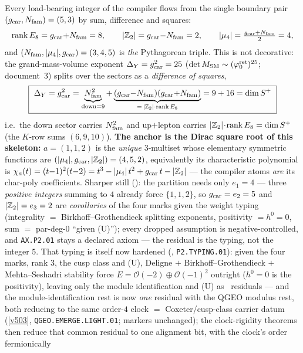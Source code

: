 \begin{keybox}[The whole integer skeleton from one pair $(\gcar,\Nfam)=(5,3)$ \mE\ (\veri{v53\_compiler\_core.py})]
Every load-bearing integer of the compiler flows from the single boundary pair
$(\gcar,\Nfam)=(5,3)$ by sum, difference and squares:
\[
  \operatorname{rank}E_8=g_{\mathrm{car}}{+}N_{\mathrm{fam}}=8,\qquad
  |\mathbb{Z}_2|=g_{\mathrm{car}}{-}N_{\mathrm{fam}}=2,\qquad
  |\mu_4|=\tfrac{g_{\mathrm{car}}+N_{\mathrm{fam}}}{2}=4,
\]
and $(N_{\mathrm{fam}},|\mu_4|,g_{\mathrm{car}})=(3,4,5)$ is \emph{the} Pythagorean triple. This is not decorative: the
grand-mass-volume exponent $\Delta_Y=g_{\mathrm{car}}^2=25$ ($\det M_{\mathrm{SM}}\sim(\varphi_0^{\mathrm{ret}})^{25}$; document~3)
splits over the sectors as a \emph{difference of squares},
\[
  \boxed{\ \Delta_Y=g_{\mathrm{car}}^2
  =\underbrace{N_{\mathrm{fam}}^2}_{\text{down}=9}
  +\underbrace{(g_{\mathrm{car}}{-}N_{\mathrm{fam}})(g_{\mathrm{car}}{+}N_{\mathrm{fam}})}_{=\,|\mathbb{Z}_2|\cdot\operatorname{rank}E_8}
  =9+16=\dim S^+\ }
\]
i.e.\ the down sector carries $N_{\mathrm{fam}}^2$ and up$+$lepton carries $|\mathbb{Z}_2|\!\cdot\!\operatorname{rank}E_8=\dim S^+$
(the $K$-row sums $(6,9,10)$). \textbf{The anchor is the Dirac square root of this skeleton:} $a=(1,1,2)$ is
the \emph{unique} $3$-multiset whose elementary symmetric functions are $(|\mu_4|,g_{\mathrm{car}},|\mathbb{Z}_2|)=(4,5,2)$,
equivalently its characteristic polynomial is
$\chi_a(t)=(t{-}1)^2(t{-}2)=t^3-|\mu_4|\,t^2+g_{\mathrm{car}}\,t-|\mathbb{Z}_2|$ --- the compiler atoms \emph{are} its
char-poly coefficients. Sharper still (): the partition needs only
$e_1=4$ --- three \emph{positive integers} summing to $4$ already force $\{1,1,2\}$, so $g_{\mathrm{car}}=e_2=5$ and
$|\mathbb{Z}_2|=e_3=2$ are \emph{corollaries} of the four marks given the weight typing (integrality $=$
Birkhoff--Grothendieck splitting exponents, positivity $=h^0{=}0$, sum $=$ par-deg-$0$ ``given (U)'');
every dropped assumption is negative-controlled, and \texttt{AX.P2.01} stays a declared axiom --- the
residual is the typing, not the integer $5$. That typing is itself now hardened
(, \texttt{P2.TYPING.01}): given the four marks, rank $3$, the cusp
class and (U), Deligne $+$ Birkhoff--Grothendieck $+$ Mehta--Seshadri stability force
$E=\mathcal O(-2)\oplus\mathcal O(-1)^2$ outright ($h^0{=}0$ is the positivity), leaving only the module
identification and (U) as \mC\ residuals --- and the module-identification rest is now \emph{one}
residual with the QGEO modulus rest, both reducing to the same order-$4$ clock $=$ Coxeter/cusp-class
carrier datum (\vref{v503}, \texttt{QGEO.EMERGE.LIGHT.01}; markers unchanged); the clock-rigidity
theorems then reduce that common residual to one alignment bit, with the clock's order fermionically

\end{keybox}
